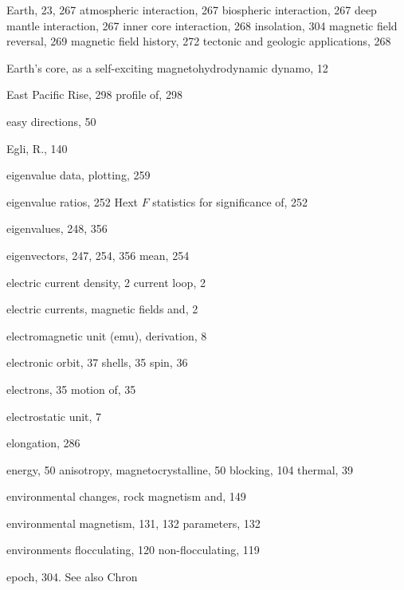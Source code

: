 \documentclass[,plain]{tauxe}
\begin{document}
\begin{theindex}
  \item Earth, 23, 267
    \subitem atmospheric interaction, 267
    \subitem biospheric interaction, 267
    \subitem deep mantle interaction, 267
    \subitem inner core interaction, 268
    \subitem insolation, 304
    \subitem magnetic field reversal, 269
    \subitem magnetic field history, 272
    \subitem tectonic and geologic applications, 268
  \item Earth's core, as a self-exciting magnetohydrodynamic dynamo, 12
  \item East Pacific Rise, 298
    \subitem profile of, 298
  \item easy directions, 50
  \item Egli, R., 140
  \item eigenvalue data, plotting, 259
  \item eigenvalue ratios, 252
    \subitem Hext $F$ statistics for significance of, 252
  \item eigenvalues, 248, 356
  \item eigenvectors, 247, 254, 356
    \subitem mean, 254
  \item electric
    \subitem current density, 2
    \subitem current loop, 2
  \item electric currents,  magnetic fields and, 2
  \item electromagnetic unit (emu), derivation, 8
  \item electronic
    \subitem orbit, 37
    \subitem shells, 35
    \subitem spin, 36
  \item electrons, 35
    \subitem motion of, 35
  \item electrostatic unit, 7
  \item elongation, 286
  \item energy, 50
    \subitem anisotropy, magnetocrystalline, 50
    \subitem blocking, 104
    \subitem thermal, 39
  \item environmental changes, rock magnetism and, 149
  \item environmental magnetism, 131, 132
    \subitem parameters, 132
  \item environments
    \subitem flocculating, 120
    \subitem non-flocculating, 119
  \item epoch, 304. See also Chron

\end{theindex}
\end{document}
